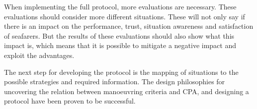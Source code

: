 When implementing the full protocol, more evaluations are necessary. These evaluations should consider more different situations. These will not only say if there is an impact on the performance, trust, situation awareness and satisfaction of seafarers. But the results of these evaluations should also show what this impact is, which means that it is possible to mitigate a negative impact and exploit the advantages.

The next step for developing the protocol is the mapping of situations to the possible strategies and required information. The design philosophies for uncovering the relation between manoeuvring criteria and CPA, and designing a protocol have been proven to be successful.
